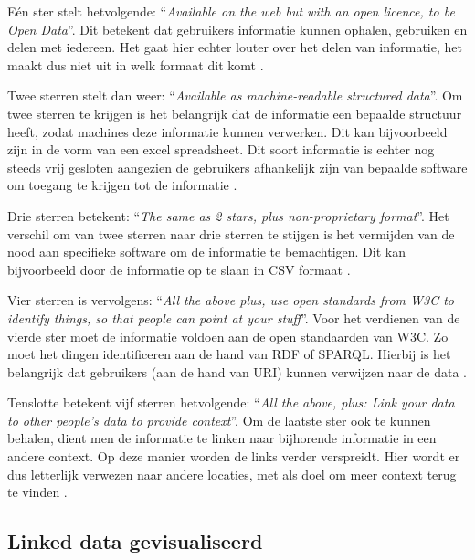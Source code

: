 Eén ster stelt hetvolgende: ``\textit{Available on the web but with an open licence, to be Open Data}''. Dit betekent dat gebruikers informatie kunnen ophalen, gebruiken en delen met iedereen. Het gaat hier echter louter over het delen van informatie, het maakt dus niet uit in welk formaat dit komt \cite{berners2006linkeddata}. 

Twee sterren stelt dan weer: ``\textit{Available as machine-readable structured data}''. Om twee sterren te krijgen is het belangrijk dat de informatie een bepaalde structuur heeft, zodat machines deze informatie kunnen verwerken. Dit kan bijvoorbeeld zijn in de vorm van een excel spreadsheet. Dit soort informatie is echter nog steeds vrij gesloten aangezien de gebruikers afhankelijk zijn van bepaalde software om toegang te krijgen tot de informatie \cite{berners2006linkeddata}.

Drie sterren betekent: ``\textit{The same as 2 stars, plus non-proprietary format}''. Het verschil om van twee sterren naar drie sterren te stijgen is het vermijden van de nood aan specifieke software om de informatie te bemachtigen. Dit kan bijvoorbeeld door de informatie op te slaan in CSV formaat \cite{berners2006linkeddata}.

Vier sterren is vervolgens: ``\textit{All the above plus, use open standards from W3C to identify things, so that people can point at your stuff}''. Voor het verdienen van de vierde ster moet de informatie voldoen aan de open standaarden van W3C. Zo moet het dingen identificeren aan de hand van RDF of SPARQL. Hierbij is het belangrijk dat gebruikers (aan de hand van URI) kunnen verwijzen naar de data \cite{berners2006linkeddata}.

Tenslotte betekent vijf sterren hetvolgende: ``\textit{All the above, plus: Link your data to other people’s data to provide context}''. Om de laatste ster ook te kunnen behalen, dient men de informatie te linken naar bijhorende informatie in een andere context. Op deze manier worden de links verder verspreidt. Hier wordt er dus letterlijk verwezen naar andere locaties, met als doel om meer context terug te vinden \cite{berners2006linkeddata}.

\subsection{Linked data gevisualiseerd}

